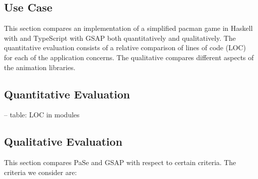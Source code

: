 \subsection{Use Case}

This section compares an implementation of a simplified pacman game in Haskell with \dsl{} and TypeScript with GSAP both quantitatively and qualitatively. The quantitative evaluation consists of a relative comparison of lines of code (LOC) for each of the application concerns. The qualitative compares different aspects of the animation libraries.

\subsection{Quantitative Evaluation}

-- table: LOC in modules

\subsection{Qualitative Evaluation}

This section compares PaSe and GSAP with respect to certain criteria. The criteria we consider are:

